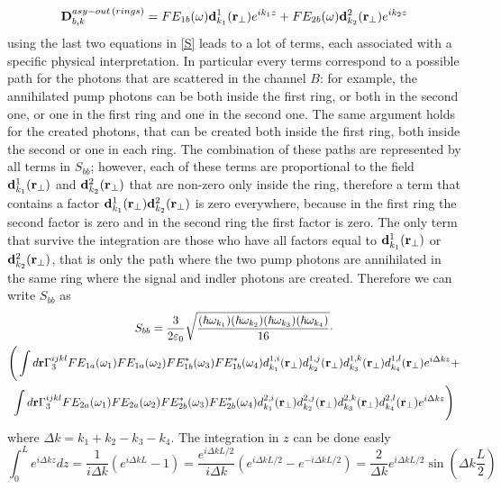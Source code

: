 \begin{equation}\mathbf{D}^{asy-out\,(rings)}_{b,k} = FE_{1b}(\omega) \mathbf{d}^1_{k_1}(\mathbf{r}_\perp)e^{ik_1z} + FE_{2b}(\omega)\mathbf{d}_{k_2}^2(\mathbf{r}_\perp)e^{ik_2z} \end{equation}
using the last two equations in \eqref{S} leads to a lot of terms, each associated with a specific physical interpretation. In particular every terms correspond to a possible path for the photons that are scattered in the channel $B$: for example, the annihilated pump photons can be both inside the first ring, or both in the second one, or one in the first ring and one in the second one. The same argument holds for the created photons, that can be created both inside the first ring, both inside the second or one in each ring. The combination of these paths are represented by all terms in $S_{bb}$; however, each of these terms are proportional to the field $\mathbf{d}^1_{k_1}(\mathbf{r}_{\perp})$ and $\mathbf{d}^2_{k_2}(\mathbf{r}_{\perp})$ that are non-zero only inside the ring, therefore a term that contains a factor $\mathbf{d}^1_{k_1}(\mathbf{r}_{\perp})\mathbf{d}^2_{k_2}(\mathbf{r}_{\perp})$ is zero everywhere, because in the first ring the second factor is zero and in the second ring the first factor is zero. The only term that survive the integration are those who have all factors equal to  $\mathbf{d}^1_{k_1}(\mathbf{r}_{\perp})$ or $\mathbf{d}^2_{k_2}(\mathbf{r}_{\perp})$, that is only the path where the two pump photons are annihilated in the same ring where the signal and indler photons are created. Therefore we can write $S_{bb}$ as
\begin{multline}S_{bb} =\frac{3}{2\varepsilon_0}\sqrt{\frac{(\hbar\omega_{k_1})(\hbar\omega_{k_2})(\hbar\omega_{k_3})(\hbar\omega_{k_4})}{16}}\cdot\\\Bigg( \int d\mathbf{r} \Gamma^{ijkl}_3FE_{1a}(\omega_1)FE_{1a}(\omega_2)FE^*_{1b}(\omega_3)FE^*_{1b}(\omega_4)d^{1,i}_{k_1}(\mathbf{r}_{\perp})d^{1,j}_{k_2}(\mathbf{r}_{\perp})d^{1,k}_{k_3}(\mathbf{r}_{\perp})d^{1,l}_{k_4}(\mathbf{r}_{\perp})e^{i\Delta k z} +\\
\int d\mathbf{r} \Gamma^{ijkl}_3FE_{2a}(\omega_1)FE_{2a}(\omega_2)FE^*_{2b}(\omega_3)FE^*_{2b}(\omega_4)d^{2,i}_{k_1}(\mathbf{r}_{\perp})d^{2,j}_{k_2}(\mathbf{r}_{\perp})d^{2,k}_{k_3}(\mathbf{r}_{\perp})d^{2,l}_{k_4}(\mathbf{r}_{\perp})e^{i\Delta k z}\Bigg)\end{multline}
where $\Delta k = k_1 + k_2 -k_3 - k_4$. The integration in $z$ can be done easly
\begin{equation}\int_0^{L} e^{i\Delta k z} dz = \frac{1}{i\Delta k}(e^{i\Delta k L} - 1) = \frac{e^{i\Delta k L/2}}{i\Delta k}(e^{i\Delta k L/2}- e^{-i\Delta k L/2}) = \frac{2}{\Delta k}e^{i\Delta k L/2} \sin\left(\Delta k \frac{L}{2}\right)\end{equation}
